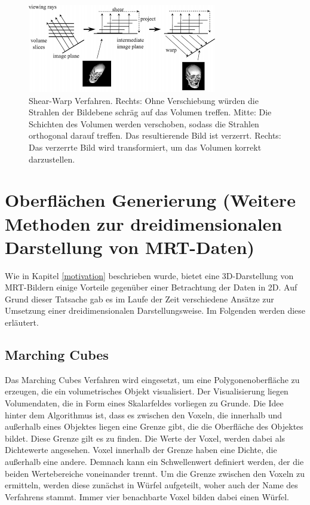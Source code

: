 \begin{figure}
	\centering
	\includegraphics[width=0.7\linewidth]{images/shearwarp.png}
	\caption{Shear-Warp Verfahren. Rechts: Ohne Verschiebung würden die Strahlen der Bildebene schräg auf das Volumen treffen. Mitte: Die Schichten des Volumen werden verschoben, sodass die Strahlen orthogonal darauf treffen. Das resultierende Bild ist verzerrt. Rechts: Das verzerrte Bild wird transformiert, um das Volumen korrekt darzustellen.}
	\label{img:shearwarp}
\end{figure}




\section{Oberflächen Generierung (Weitere Methoden zur dreidimensionalen Darstellung von MRT-Daten)}		 %
Wie in Kapitel \ref{motivation} beschrieben wurde, bietet eine 3D-Darstellung von MRT-Bildern einige Vorteile gegenüber einer Betrachtung der Daten in 2D. 
Auf Grund dieser Tatsache gab es im Laufe der Zeit verschiedene Ansätze zur Umsetzung einer dreidimensionalen Darstellungsweise. 
Im Folgenden werden diese erläutert. 



\subsection{Marching Cubes}
\label{marchingCubes}

Das Marching Cubes Verfahren wird eingesetzt, um eine Polygonenoberfläche zu erzeugen, die ein volumetrisches Objekt visualisiert. 
Der Visualisierung liegen Volumendaten, die in Form eines Skalarfeldes vorliegen zu Grunde.
Die Idee hinter dem Algorithmus ist, dass es zwischen den Voxeln, die innerhalb und außerhalb eines Objektes liegen eine Grenze gibt, die die Oberfläche des Objektes bildet. Diese Grenze gilt es zu finden. 
Die Werte der Voxel, werden dabei als Dichtewerte angesehen. Voxel innerhalb der Grenze haben eine Dichte, die außerhalb eine andere. Demnach kann ein Schwellenwert definiert werden, der die beiden Wertebereiche voneinander trennt.
Um die Grenze zwischen den Voxeln zu ermitteln, werden diese zunächst in Würfel aufgeteilt, woher auch der Name des Verfahrens stammt. Immer vier benachbarte Voxel bilden dabei einen Würfel.  

